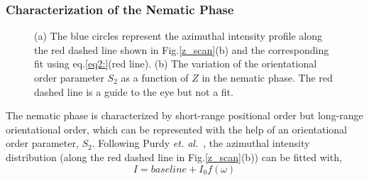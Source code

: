 \documentclass[aps,prl,preprint,superscriptaddress]{revtex4-1}
\begin{document}
\subsubsection{Characterization of the Nematic Phase}
\begin{figure}[h]
\caption{(a) The blue circles represent the azimuthal intensity profile along the red dashed line shown in Fig.\ref{z_scan}(b) and the corresponding fit using eq.\ref{eq2:}(red line). (b) The variation of the orientational order parameter $S_2$ as a function of $Z$ in the nematic phase. The red dashed line is a guide to the eye but not a fit.}
\label{order_param}
\end{figure} 
The nematic phase is characterized by short-range positional order but long-range orientational order, which can be represented with the help of an orientational order parameter, $S_2$. Following Purdy \emph{et. al.}~\cite{purdy2003measuring, kleshchanok2010structures}, the azimuthal intensity distribution (along the red dashed line in Fig.\ref{z_scan}(b)) can be fitted with,
\begin{equation}
\label{eq2:}
I= baseline +  I_0 f(\omega)
\end{equation} 
\end{document}
